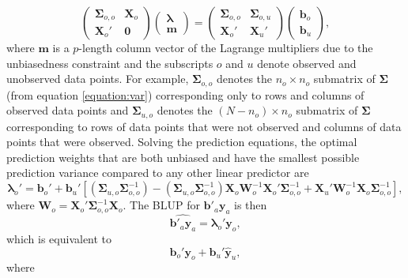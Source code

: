 \documentclass[smallextended]{svjour3}       %
\begin{document}
\begin{equation}
\begin{pmatrix}
\bm{\Sigma}_{o, o} & \mathbf{X}_o \\
\mathbf{X}_o' & \mathbf{0}
\end{pmatrix} 
\begin{pmatrix}
\bm{\lambda} \\
\mathbf{m}
\end{pmatrix} = 
\begin{pmatrix}
\bm{\Sigma}_{o, o} & \bm{\Sigma}_{o, u} \\
\mathbf{X}_{o}' & \mathbf{X}_{u}'
\end{pmatrix} 
\begin{pmatrix}
\mathbf{b}_{o} \\
\mathbf{b}_{u}
\end{pmatrix},
\end{equation} \noindent where \(\mathbf{m}\) is a \(p\)-length column
vector of the Lagrange multipliers due to the unbiasedness constraint
and the subscripts \(o\) and \(u\) denote observed and unobserved data
points. For example, \(\bm{\Sigma}_{o, o}\) denotes the
\(n_o \times n_o\) submatrix of \(\bm{\Sigma}\) (from equation
\ref{equation:var}) corresponding only to rows and columns of observed
data points and \(\bm{\Sigma}_{u, o}\) denotes the
\((N - n_o) \times n_o\) submatrix of \(\bm{\Sigma}\) corresponding to
rows of data points that were not observed and columns of data points
that were observed. Solving the prediction equations, the optimal
prediction weights that are both unbiased and have the smallest possible
prediction variance compared to any other linear predictor are \mbox{}
\begin{equation}
\bm{\lambda}_o' = \mathbf{b}_{o}' + \mathbf{b}_{u}'\left[ (\bm{\Sigma}_{u, o}\bm{\Sigma}_{o, o}^{-1}) - (\bm{\Sigma}_{u, o} \bm{\Sigma}_{o, o}^{-1})\mathbf{X}_o\mathbf{W}_o^{-1}\mathbf{X}_o'\bm{\Sigma}_{o, o}^{-1} + \mathbf{X}_{u}'\mathbf{W}_o^{-1}\mathbf{X}_o \bm{\Sigma}_{o, o}^{-1} \right],
\end{equation} \noindent where
\(\mathbf{W}_o = \mathbf{X}_o'\bm{\Sigma}_{o, o}^{-1}\mathbf{X}_o\). The
BLUP for \(\mathbf{b}'_a \mathbf{y}_a\) is then \mbox{}
\begin{equation} \label{equation:blup}
\widehat{\mathbf{b}'_a \mathbf{y}_a} = \bm{\lambda}_o' \mathbf{y}_o,
\end{equation} \noindent which is equivalent to \mbox{}
\begin{equation*}
\mathbf{b}_{o}'\mathbf{y}_{o} + \mathbf{b}_{u}' \mathbf{\hat{y}}_{u},
\end{equation*} \noindent where
\end{document}
